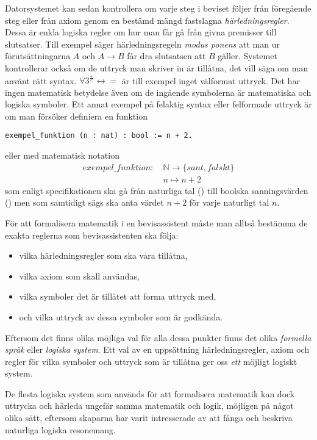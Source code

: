 Datorsystemet kan sedan kontrollera om varje steg i beviset följer från
föregående steg eller från axiom genom en bestämd mängd fastslagna
\emph{härledningsregler}. Dessa är enkla logiska regler om hur man får gå från
givna premisser till slutsatser. Till exempel säger härledningsregeln
\emph{modus ponens} att man ur förutsättningarna $A$ och $A \to B$ får dra
slutsatsen att $B$ gäller. Systemet kontrollerar också om de uttryck man
skriver in är tillåtna, det vill säga om man använt rätt syntax.
$\forall 3^{\frac{+}{\in}} \leftrightarrow =$ är till exempel inget välformat
uttryck. Det har ingen matematisk betydelse även om de ingående symbolerna är
matematiska och logiska symboler. Ett annat exempel på felaktig syntax eller
felformade uttryck är om man försöker definiera en funktion
\begin{lstlisting}
exempel_funktion (n : nat) : bool := n + 2.
\end{lstlisting}
eller med matematisk notation
\begin{align*}
  exempel\_funktion :\ &\mathbb{N} \to \{sant, falskt\} \\
                       &n \mapsto n + 2
\end{align*}
som enligt specifikationen ska gå från naturliga tal () till boolska
sanningsvärden () men som samtidigt sägs ska anta värdet $n + 2$ för
varje naturligt tal $n$.

För att formalisera matematik i en bevisassistent måste man alltså bestämma de
exakta reglerna som bevisassistenten ska följa:
\begin{itemize}
  \item vilka härledningsregler som ska vara tillåtna,
  \item vilka axiom som skall användas,
  \item vilka symboler det är tillåtet att forma uttryck med,
  \item och vilka uttryck av dessa symboler som är godkända.
\end{itemize}
Eftersom det finns olika möjliga val för alla dessa punkter finns det olika
\emph{formella språk} eller \emph{logiska system}. Ett val av en uppsättning
härledningsregler, axiom och regler för vilka symboler och uttryck som är
tillåtna ger oss \emph{ett} möjligt logiskt system.

De flesta logiska system som används för att formalisera matematik kan dock
uttrycka och härleda ungefär samma matematik och logik, möjligen på något olika
sätt, eftersom skaparna har varit intresserade av att fånga och beskriva
naturliga logiska resonemang.

